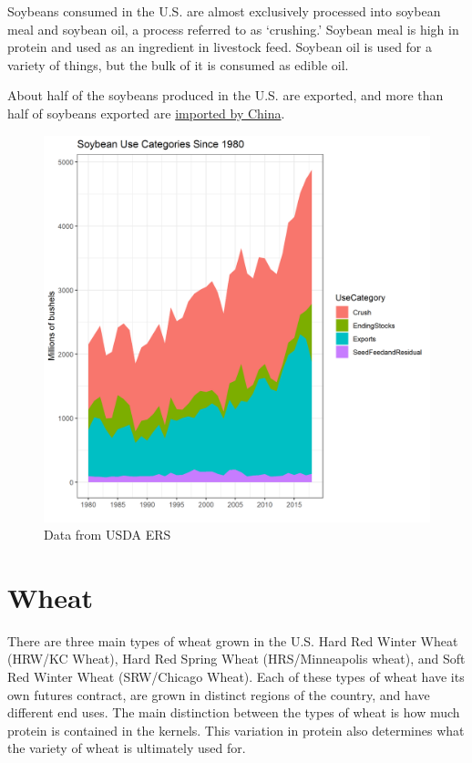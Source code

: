 \documentclass[
]{book}
\begin{document}
Soybeans consumed in the U.S. are almost exclusively processed into soybean meal and soybean oil, a process referred to as `crushing.' Soybean meal is high in protein and used as an ingredient in livestock feed. Soybean oil is used for a variety of things, but the bulk of it is consumed as edible oil.

About half of the soybeans produced in the U.S. are exported, and more than half of soybeans exported are \href{http://farmdocdaily.illinois.edu/2015/03/footprint-of-chinese-demand-for-us-soybeans.html}{imported by China}.

\begin{figure}
\centering
\includegraphics{assets/PrimerforGrain_SoyUse.png}
\caption{Data from USDA ERS}
\end{figure}

\hypertarget{wheat}{%
\section{Wheat}\label{wheat}}

There are three main types of wheat grown in the U.S. Hard Red Winter Wheat (HRW/KC Wheat), Hard Red Spring Wheat (HRS/Minneapolis wheat), and Soft Red Winter Wheat (SRW/Chicago Wheat). Each of these types of wheat have its own futures contract, are grown in distinct regions of the country, and have different end uses. The main distinction between the types of wheat is how much protein is contained in the kernels. This variation in protein also determines what the variety of wheat is ultimately used for.
\end{document}

